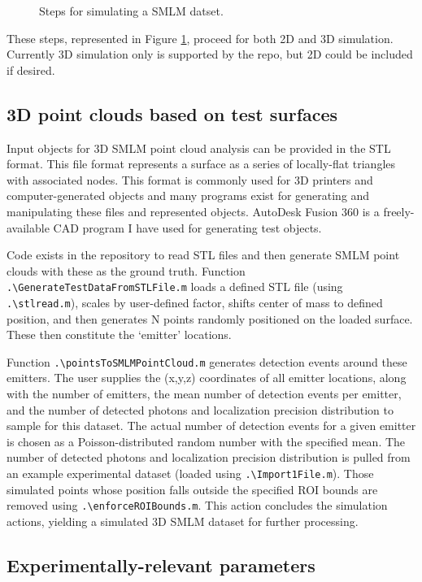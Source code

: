 \documentclass[10pt,a4paper]{article}
\begin{document}
\begin{figure}
\caption{Steps for simulating a SMLM datset.}
\label{fig:smlmSimulation2D}
\end{figure}


These steps, represented in Figure \ref{fig:smlmSimulation2D}, proceed for both 2D and 3D simulation.  Currently 3D simulation only is supported by the repo, but 2D could be included if desired.

\subsection{3D point clouds based on test surfaces}

Input objects for 3D SMLM point cloud analysis can be provided in the STL format.  This file format represents a surface as a series of locally-flat triangles with associated nodes.  This format is commonly used for 3D printers and computer-generated objects and many programs exist for generating and manipulating these files and represented objects.  AutoDesk Fusion 360 is a freely-available CAD program I have used for generating test objects.  

Code exists in the repository to read STL files and then generate SMLM point clouds with these as the ground truth.  Function \texttt{.\textbackslash GenerateTestDataFromSTLFile.m} loads a defined STL file (using \texttt{.\textbackslash stlread.m}), scales by user-defined factor, shifts center of mass to defined position, and then generates N points randomly positioned on the loaded surface.  These then constitute the `emitter' locations.  

Function \texttt{.\textbackslash pointsToSMLMPointCloud.m} generates detection events around these emitters.  The user supplies the (x,y,z) coordinates of all emitter locations, along with the number of emitters, the mean number of detection events per emitter, and the number of detected photons and localization precision distribution to sample for this dataset.  The actual number of detection events for a given emitter is chosen as a Poisson-distributed random number with the specified mean.  The number of detected photons and localization precision distribution is pulled from an example experimental dataset (loaded using \texttt{.\textbackslash Import1File.m}).  Those simulated points whose position falls outside the specified ROI bounds are removed using \texttt{.\textbackslash enforceROIBounds.m}.  This action concludes the simulation actions, yielding a simulated 3D SMLM dataset for further processing.

\subsection{Experimentally-relevant parameters}
\end{document}
